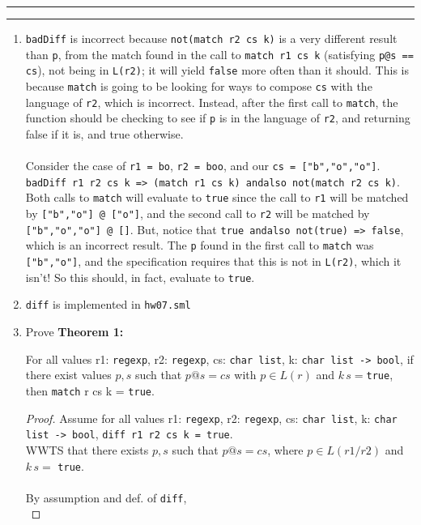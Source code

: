 \documentclass[11pt]{article}
\newcommand{\question}[2] {\vspace{.25in} \hrule\vspace{0.5em}
\noindent{\bf #1: #2} \vspace{0.5em}
\hrule \vspace{.10in}}
\begin{document}
\question{4}{Regexp}
\begin{enumerate}
\item \verb|badDiff| is incorrect because \verb|not(match r2 cs k)| is a very different result than \verb|p|, from the match found in the call to \verb|match r1 cs k| (satisfying \verb|p@s == cs|), not being in \verb|L(r2)|; it will yield \verb|false| more often than it should.  This is because \verb|match| is going to be looking for ways to compose \verb|cs| with the language of \verb|r2|, which is incorrect.  Instead, after the first call to \verb|match|, the function should be checking to see if \verb|p| is in the language of \verb|r2|, and returning false if it is, and true otherwise.\\\\
Consider the case of \verb|r1 = bo|, \verb|r2 = boo|, and our \verb|cs = ["b","o","o"]|. \\
\verb|badDiff r1 r2 cs k => (match r1 cs k) andalso not(match r2 cs k)|.  Both calls to \verb|match| will evaluate to \verb|true| since the call to \verb|r1| will be matched by \verb|["b","o"] @ ["o"]|, and the second call to \verb|r2| will be matched by \verb|["b","o","o"] @ []|.  But, notice that \verb|true andalso not(true) => false|, which is an incorrect result.  The \verb|p| found in the first call to \verb|match| was \verb|["b","o"]|, and the specification requires that this is not in \verb|L(r2)|, which it isn't!  So this should, in fact, evaluate to \verb|true|.
\item \verb|diff| is implemented in \verb|hw07.sml|
\item Prove \textbf{Theorem 1:} 
\begin{flushleft}
For all values r1: \verb|regexp|, r2: \verb|regexp|, cs: \verb|char list|, k: \verb|char list -> bool|, if there exist values $p,s$ such that $p@s = cs$ with $p\in L(r)$ and $k \,s = $\verb|true|,\\
then \verb|match| r cs k = \verb|true|.
\end{flushleft}
\begin{proof}
Assume for all values r1: \verb|regexp|, r2: \verb|regexp|, cs: \verb|char list|, k: \verb|char list -> bool|, \verb|diff r1 r2 cs k = true|.\\
WWTS that there exists $p,s$ such that $p@s = cs$, where $p\in L(r1/r2)$ and $k \,s =$ \verb|true|.\\\\
By assumption and def. of \verb|diff|,\\

\end{proof}
\end{enumerate}
\end{document}
